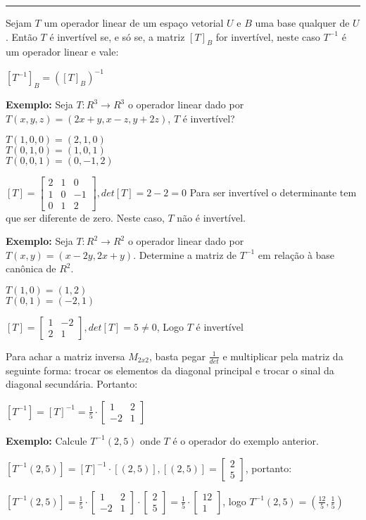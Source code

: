 \documentclass[10pt,landscape]{article}
\begin{document}
\begin{multicols}{3}
\medskip 
\hrule
\medskip

Sejam $T$ um operador linear de um espaço vetorial $U$ e $B$ uma base qualquer de $U$. Então $T$ é invertível se, e só se, a matriz $[T]_B$ for invertível, neste caso $T^{-1}$ é um operador linear e vale:

$[T^{-1}]_B=([T]_B)^{-1}$

\textbf{Exemplo:} Seja $T:R^3\rightarrow R^3$ o operador linear dado por $T(x,y,z)=(2x+y,x-z,y+2z)$, $T$ é invertível? 

$T(1,0,0)=(2,1,0)$\\
$T(0,1,0)=(1,0,1)$\\
$T(0,0,1)=(0,-1,2)$

$[T]=\begin{bmatrix}2&1&0\\1&0&-1\\0&1&2\end{bmatrix},det[T]=2-2=0$ Para ser invertível o determinante tem que ser diferente de zero. Neste caso, $T$ não é invertível.

\textbf{Exemplo:} Seja $T:R^2\rightarrow R^2$ o operador linear dado por $T(x,y)=(x-2y,2x+y)$. Determine a matriz de $T^{-1}$ em relação à base canônica de $R^2$.

$T(1,0)=(1,2)$\\
$T(0,1)=(-2,1)$

$[T]=\begin{bmatrix}1&-2\\2&1\end{bmatrix}, det[T]=5\neq 0$, Logo $T$ é invertível

Para achar a matriz inversa $M_{2x2}$, basta pegar $\frac{1}{det}$ e multiplicar pela matriz da seguinte forma: trocar os elementos da diagonal principal e trocar o sinal da diagonal secundária. Portanto:

$[T^{-1}]=[T]^{-1}=\frac{1}{5}\cdot \begin{bmatrix}1&2\\-2&1\end{bmatrix}$

\textbf{Exemplo: } Calcule $T^{-1}(2,5)$ onde $T$ é o operador do exemplo anterior.

$[T^{-1}(2,5)]=[T]^{-1}\cdot[(2,5)], [(2,5)]=\begin{bmatrix}2\\5\end{bmatrix}$, portanto:

$[T^{-1}(2,5)]=\frac{1}{5}\cdot \begin{bmatrix}1&2\\-2&1\end{bmatrix}\cdot\begin{bmatrix}2\\5\end{bmatrix}=\frac{1}{5}\cdot\begin{bmatrix}12\\1\end{bmatrix}$, logo $T^{-1}(2,5)=(\frac{12}{5},\frac{1}{5})$


\end{multicols}
\end{document}
